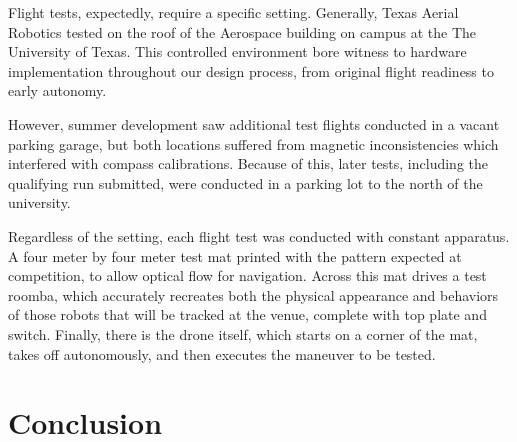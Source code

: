 \documentclass[12pt,letterpaper]{article}
\begin{document}
    	Flight tests, expectedly, require a specific setting. Generally, Texas Aerial Robotics tested on the roof of the Aerospace building on campus at the The University of Texas. This controlled environment bore witness to hardware implementation throughout our design process, from original flight readiness to early autonomy.

		However, summer development saw additional test flights conducted in a vacant parking garage, but both locations suffered from magnetic inconsistencies which interfered with compass calibrations. Because of this, later tests, including the qualifying run submitted, were conducted in a parking lot to the north of the university. 

		Regardless of the setting, each flight test was conducted with constant apparatus. A four meter by four meter test mat printed with the pattern expected at competition, to allow optical flow for navigation. Across this mat drives a test roomba, which accurately recreates both the physical appearance and behaviors of those robots that will be tracked at the venue, complete with top plate and switch. Finally, there is the drone itself, which starts on a corner of the mat, takes off autonomously, and then executes the maneuver to be tested.


\section*{Conclusion}
	\nocite{redmon2016yolo9000}
	
	
\end{document}
